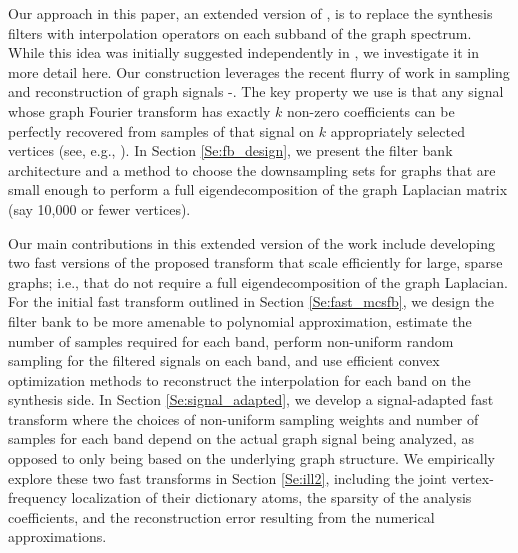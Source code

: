 \documentclass[journal, 10pt]{IEEEtran}
\begin{document}
Our approach in this paper, an extended version of \cite{jin_conf}, is to replace the synthesis filters with interpolation operators on each subband of the graph spectrum. While this idea was initially suggested independently in \cite{chen2015discrete}, we investigate it in more detail here. Our construction leverages the recent flurry of work in sampling and reconstruction of graph signals \cite{chen2015discrete}-\nocite{pesenson_paley,narang2013interpolation,anis2014towards,gadde2015probabilistic,shomorony,PuyTGV15,chen2015signal,tsitsvero2016uncertainty,chen2016signal,anis2016efficient}\cite{di2017sampling}. The key property we use is that any signal whose graph Fourier transform has exactly $k$ non-zero coefficients can be perfectly recovered from samples of that signal on $k$ appropriately selected vertices (see, e.g., \cite[Theorem 1]{chen2015discrete} \cite[Proposition 1]{anis2016efficient}). In Section \ref{Se:fb_design}, we present the filter bank architecture and a method to choose the downsampling sets for graphs that are small enough to perform a full eigendecomposition of the graph Laplacian matrix (say 10,000 or fewer vertices). 

Our main contributions in this extended version of the work include developing two fast versions of the proposed transform that scale efficiently for large, sparse graphs; i.e., that do not require a full eigendecomposition of the graph Laplacian. For the initial fast transform outlined in Section \ref{Se:fast_mcsfb}, we design the filter bank to be more amenable to polynomial approximation, estimate the number of samples required for each band, perform non-uniform random sampling for the filtered signals on each band, and use efficient convex optimization methods to reconstruct the interpolation for each band on the synthesis side. In Section \ref{Se:signal_adapted}, we develop a signal-adapted fast transform where the choices of non-uniform sampling weights and number of samples for each band depend on the actual graph signal being analyzed, as opposed to only being based on the underlying graph structure. We 
empirically explore these two fast transforms in Section \ref{Se:ill2}, including the joint vertex-frequency localization of their dictionary atoms, the sparsity of the analysis coefficients, and the reconstruction error resulting from the numerical approximations.

\end{document}
